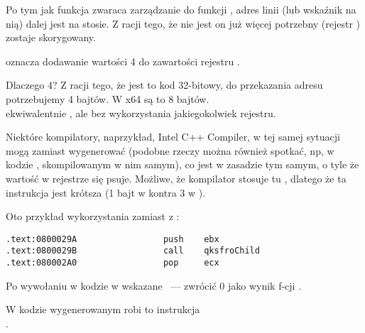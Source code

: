 Po tym jak funkcja \printf zwaraca zarządzanie do funkcji \main, adres linii (lub wskaźnik na nią) dalej jest na stosie.
Z racji tego, że nie jest on już więcej potrzebny  (rejestr \ESP) zostaje skorygowany.

 oznacza dodawanie wartości 4 do zawartości rejestru \ESP.

Dlaczego 4? Z racji tego, że jest to kod 32-bitowy, do przekazania adresu potrzebujemy 4 bajtów. W x64 są to 8 bajtów.\\
 ekwiwalentnie , ale bez wykorzystania jakiegokolwiek rejestru.

\myindex{\oracle}

Niektóre kompilatory, naprzykład, Intel C++ Compiler, w tej samej sytuacji mogą zamiast 
\ADD wygenerować  (podobne rzeczy można również spotkać, np, w kodzie \oracle{}, skompilowanym w nim samym),
co jest w zasadzie tym samym, o tyle że wartość w rejestrze \ECX się psuje.
Możliwe, że kompilator stosuje tu , dlatego że ta instrukcja jest krótsza (1 bajt w  kontra 3 w ).

Oto przykład wykorzystania \POP zamiast \ADD z \oracle{}:

\begin{lstlisting}[caption=\oracle 10.2 Linux (plik app.o),style=customasmx86]
.text:0800029A                 push    ebx
.text:0800029B                 call    qksfroChild
.text:080002A0                 pop     ecx
\end{lstlisting}



Po wywołaniu \printf w kodzie w \CCpp wskazane ~--- zwrócić 0 jako wynik f-cji \main.

W kodzie wygenerowanym robi to instrukcja \\
.

